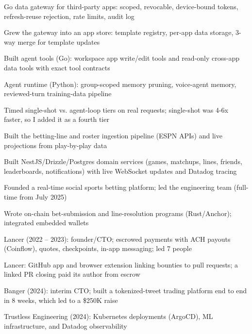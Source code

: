 \documentclass[print]{jack-resume}
\begin{document}
\begin{tightemize}
    \item Go data gateway for third-party apps: scoped, revocable, device-bound tokens, refresh-reuse rejection, rate limits, audit log
    \item Grew the gateway into an app store: template registry, per-app data storage, 3-way merge for template updates
    \item Built agent tools (Go): workspace app write/edit tools and read-only cross-app data tools with exact tool contracts
    \item Agent runtime (Python): group-scoped memory pruning, voice-agent memory, reviewed-turn training-data pipeline
    \item Timed single-shot vs. agent-loop tiers on real requests; single-shot was 4-6x faster, so I added it as a fourth tier
\end{tightemize}
\sectionsep

\begin{tightemize}
    \item Built the betting-line and roster ingestion pipeline (ESPN APIs) and live projections from play-by-play data
    \item Built NestJS/Drizzle/Postgres domain services (games, matchups, lines, friends, leaderboards, notifications) with live WebSocket updates and Datadog tracing
    \item Founded a real-time social sports betting platform; led the engineering team (full-time from July 2025)
    \item Wrote on-chain bet-submission and line-resolution programs (Rust/Anchor); integrated embedded wallets
\end{tightemize}
\sectionsep

\begin{tightemize}
    \item Lancer (2022 -- 2023): founder/CTO; escrowed payments with ACH payouts (Coinflow), quotes, checkpoints, in-app messaging; led 7 people
    \item Lancer: GitHub app and browser extension linking bounties to pull requests; a linked PR closing paid its author from escrow
    \item Banger (2024): interim CTO; built a tokenized-tweet trading platform end to end in 8 weeks, which led to a \$250K raise
    \item Trustless Engineering (2024): Kubernetes deployments (ArgoCD), ML infrastructure, and Datadog observability
\end{tightemize}
\sectionsep
\end{document}
